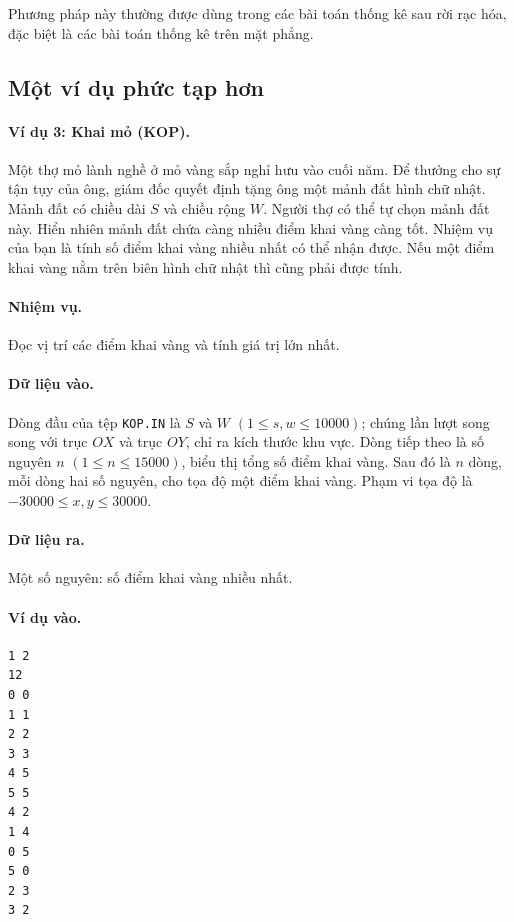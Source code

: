 \documentclass[11pt]{article}
\begin{document}
Phương pháp này thường được dùng trong các bài toán thống kê sau rời rạc hóa,
đặc biệt là các bài toán thống kê trên mặt phẳng.

\subsection{Một ví dụ phức tạp hơn}

\paragraph{Ví dụ 3: Khai mỏ (KOP).}
Một thợ mỏ lành nghề ở mỏ vàng sắp nghỉ hưu vào cuối năm. Để thưởng cho sự
tận tụy của ông, giám đốc quyết định tặng ông một mảnh đất hình chữ nhật. Mảnh
đất có chiều dài \(S\) và chiều rộng \(W\). Người thợ có thể tự chọn mảnh đất
này. Hiển nhiên mảnh đất chứa càng nhiều điểm khai vàng càng tốt. Nhiệm vụ của
bạn là tính số điểm khai vàng nhiều nhất có thể nhận được. Nếu một điểm khai
vàng nằm trên biên hình chữ nhật thì cũng phải được tính.

\paragraph{Nhiệm vụ.}
Đọc vị trí các điểm khai vàng và tính giá trị lớn nhất.

\paragraph{Dữ liệu vào.}
Dòng đầu của tệp \texttt{KOP.IN} là \(S\) và \(W\)
\((1\le s,w\le 10000)\); chúng lần lượt song song với trục \(OX\) và trục
\(OY\), chỉ ra kích thước khu vực. Dòng tiếp theo là số nguyên \(n\)
\((1\le n\le 15000)\), biểu thị tổng số điểm khai vàng. Sau đó là \(n\) dòng,
mỗi dòng hai số nguyên, cho tọa độ một điểm khai vàng. Phạm vi tọa độ là
\(-30000\le x,y\le 30000\).

\paragraph{Dữ liệu ra.}
Một số nguyên: số điểm khai vàng nhiều nhất.

\paragraph{Ví dụ vào.}
\begin{verbatim}
1 2
12
0 0
1 1
2 2
3 3
4 5
5 5
4 2
1 4
0 5
5 0
2 3
3 2
\end{verbatim}
\end{document}
